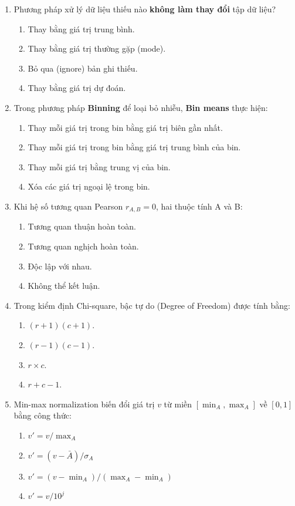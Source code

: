 \documentclass[10pt]{article}
\begin{document}
\begin{enumerate}[leftmargin=*, label=\textbf{Câu \arabic*.}]
    \item Phương pháp xử lý dữ liệu thiếu nào \textbf{không làm thay đổi} tập dữ liệu?
    \begin{enumerate}[label=\Alph*.]
        \item Thay bằng giá trị trung bình.
        \item Thay bằng giá trị thường gặp (mode).
        \item Bỏ qua (ignore) bản ghi thiếu.
        \item Thay bằng giá trị dự đoán.
    \end{enumerate}

    \item Trong phương pháp \textbf{Binning} để loại bỏ nhiễu, \textbf{Bin means} thực hiện:
    \begin{enumerate}[label=\Alph*.]
        \item Thay mỗi giá trị trong bin bằng giá trị biên gần nhất.
        \item Thay mỗi giá trị trong bin bằng giá trị trung bình của bin.
        \item Thay mỗi giá trị bằng trung vị của bin.
        \item Xóa các giá trị ngoại lệ trong bin.
    \end{enumerate}

    \item Khi hệ số tương quan Pearson $r_{A,B} = 0$, hai thuộc tính A và B:
    \begin{enumerate}[label=\Alph*.]
        \item Tương quan thuận hoàn toàn.
        \item Tương quan nghịch hoàn toàn.
        \item Độc lập với nhau.
        \item Không thể kết luận.
    \end{enumerate}

    \item Trong kiểm định Chi-square, bậc tự do (Degree of Freedom) được tính bằng:
    \begin{enumerate}[label=\Alph*.]
        \item $(r+1)(c+1)$.
        \item $(r-1)(c-1)$.
        \item $r \times c$.
        \item $r + c - 1$.
    \end{enumerate}

    \item Min-max normalization biến đổi giá trị $v$ từ miền $[\min_A, \max_A]$ về $[0, 1]$ bằng công thức:
    \begin{enumerate}[label=\Alph*.]
        \item $v' = v / \max_A$
        \item $v' = (v - \bar{A}) / \sigma_A$
        \item $v' = (v - \min_A) / (\max_A - \min_A)$
        \item $v' = v / 10^j$
    \end{enumerate}


\end{enumerate}
\end{document}
